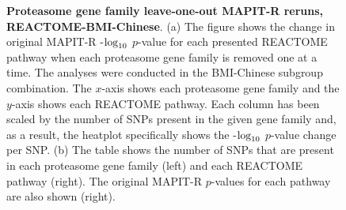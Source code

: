 \documentclass[10pt,a4paper]{article}
\def\log{{\rm log}}
\begin{document}
\begin{figure}[ht]
\centering
\vspace*{-.5cm}
\par
{}
\caption[TBD]{\textbf{Proteasome gene family leave-one-out MAPIT-R reruns, REACTOME-BMI-Chinese}. (a) The figure shows the change in original MAPIT-R -$\log_{10}$ $p$-value for each presented REACTOME pathway when each proteasome gene family is removed one at a time. The analyses were conducted in the BMI-Chinese subgroup combination. The $x$-axis shows each proteasome gene family and the $y$-axis shows each REACTOME pathway. Each column has been scaled by the number of SNPs present in the given gene family and, as a result, the heatplot specifically shows the -$\log_{10}$ $p$-value change per SNP. (b) The table shows the number of SNPs that are present in each proteasome gene family (left) and each REACTOME pathway (right). The original MAPIT-R $p$-values for each pathway are also shown (right).}
\label{InterPath-Supp-Figure-Prot-Heatplots-Chinese}
\end{figure}
\clearpage
\addtocounter{figure}{-1}
\addtocounter{CharNumber5}{1}
\end{document}
